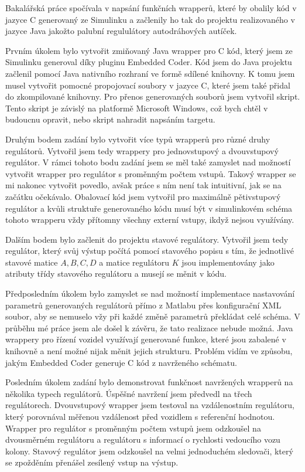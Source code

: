\documentclass[thesis=M,czech,hidelinks]{FITthesis}[2012/06/26]
\begin{document}
 \setlength{\parskip}{10pt}
\begin{conclusion}
Bakalářská práce spočívala v napsání funkčních wrapperů, které by obalily kód v jazyce C generovaný ze Simulinku a začlenily ho tak do projektu realizovaného v jazyce Java jakožto palubní regululátory autodráhových autíček.

Prvním úkolem bylo vytvořit zmiňovaný Java wrapper pro C kód, který jsem ze Simulinku generoval díky pluginu Embedded Coder. Kód jsem do Java projektu začlenil pomocí Java nativního rozhraní ve formě sdílené knihovny. K tomu jsem musel vytvořit pomocné propojovací soubory v jazyce C, které jsem také přidal do zkompilované knihovny. Pro přenos generovaných souborů jsem vytvořil skript. Tento skript je závislý na platformě Microsoft Windows, což bych chtěl v budoucnu opravit, nebo skript nahradit napsáním targetu.

Druhým bodem zadání bylo vytvořit více typů wrapperů pro různé druhy regulátorů. Vytvořil jsem tedy wrappery pro jednovstupový a dvouvstupový regulátor. V rámci tohoto bodu zadání jsem se měl také zamyslet nad možností vytvořit wrapper pro regulátor s proměnným počtem vstupů. Takový wrapper se mi nakonec vytvořit povedlo, avšak práce s ním není tak intuitivní, jak se na začátku očekávalo. Obalovací kód jsem vytvořil pro  maximálně pětivstupový regulátor a kvůli struktuře generovaného kódu musí být v simulinkovém schéma tohoto wrapperu vždy přítomny všechny externí vstupy, ikdyž nejsou využívány. 

Dalším bodem bylo začlenit do projektu stavové regulátory. Vytvořil jsem tedy regulátor, který svůj výstup počítá pomocí stavového popisu s tím, že jednotlivé stavové matice $A,B,C,D$ a matice regulátoru $K$ jsou implementovány jako atributy třídy stavového regulátoru a musejí se měnit v kódu.

Předposledním úkolem bylo zamyslet se nad možností implementace nastavování parametrů generovaných regulátorů přímo z Matlabu přes konfigurační XML soubor, aby se nemuselo vžy při každé změně parametrů překládat celé schéma. V průběhu mé práce jsem ale došel k závěru, že tato realizace nebude možná. Java wrappery pro řízení vozidel využívají generované funkce, které jsou zabalené v knihovně a není možné nijak měnit jejich strukturu. Problém vidím ve způsobu, jakým Embedded Coder generuje C kód z navrženého schématu.

Posledním úkolem zadání bylo demonstrovat funkčnost navržených wrapperů na několika typech regulátorů. Úspěšné navržení jsem předvedl na třech regulátorech. Dvouvstupový wrapper jsem testoval na vzdálenostním regulátoru, který porovnával měřenou vzdálenost před vozidlem s referenční hodnotou. Wrapper pro regulátor s proměnným počtem vstupů jsem odzkoušel na dvousměrném regulátoru a regulátoru s informací o rychlosti vedoucího vozu kolony. Stavový regulátor jsem odzkoušel na velmi jednoduchém sledovači, který se zpožděním přenášel zesílený vstup na výstup.
\end{conclusion}
\end{document}

